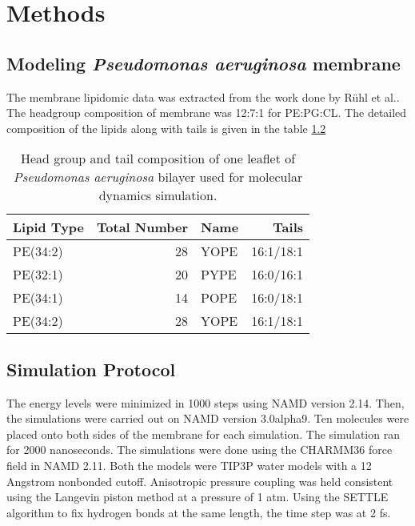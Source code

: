 \section{Methods}
\subsection{Modeling \emph{Pseudomonas aeruginosa} membrane}
The membrane lipidomic data was extracted from the work done by R{\"u}hl et al.\cite{ruhl2012glycerophospholipid}.
The headgroup composition of membrane was 12:7:1 for PE:PG:CL.
The detailed composition of the lipids along with tails is given in the table \ref{}  

\begin{table}
	\caption{\label{tab:bilayers}Head group and tail composition of one leaflet of \emph{Pseudomonas aeruginosa} bilayer used for molecular dynamics simulation. }
	
	\begin{tabular}{lrlr}
		\toprule
		Lipid Type &  Total Number & Name & Tails \\
		\midrule
		PE(34:2)   &   28		   & YOPE &  16:1/18:1 \\
		PE(32:1)   &   20		   & PYPE &  16:0/16:1 \\
		PE(34:1)   &   14		   & POPE &  16:0/18:1 \\
		PE(34:2)   &   28		   & YOPE &  16:1/18:1
		
	\end{tabular}
\end{table}

\subsection{Simulation Protocol}
The energy levels were minimized in 1000 steps using NAMD version 2.14\cite{phillips2005scalable}. Then, the simulations were carried out on NAMD version 3.0alpha9. Ten molecules were placed onto both sides of the membrane for each simulation. The simulation ran for 2000 nanoseconds.
The simulations were done using the CHARMM36 force field in NAMD 2.11\cite{phillips2005scalable}. Both the models were TIP3P water models with a 12 Angstrom nonbonded cutoff. Anisotropic pressure coupling was held consistent using the Langevin piston method at a pressure of 1 atm. Using the SETTLE algorithm to fix hydrogen bonds at the same length, the time step was at 2 fs.